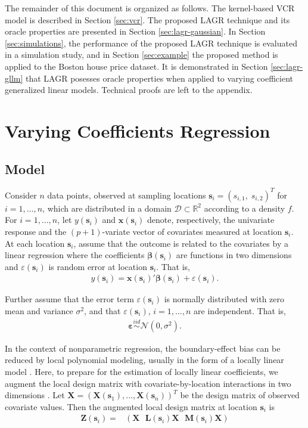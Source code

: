 \documentclass[authoryear,review, 12pt]{elsarticle}
\begin{document}
The remainder of this document is organized as follows. The kernel-based
VCR model is described in Section \ref{sec:vcr}. The proposed LAGR
technique and its oracle properties are presented in Section \ref{sec:lagr-gaussian}.
In Section \ref{sec:simulations}, the performance of the proposed
LAGR technique is evaluated in a simulation study, and in Section
\ref{sec:example} the proposed method is applied to the Boston house
price dataset. It is demonstrated in Section \ref{sec:lagr-gllm}
that LAGR posesses oracle properties when applied to varying coefficient
generalized linear models. Technical proofs are left to the appendix.


\section{Varying Coefficients Regression\label{sec:vcr}}


\subsection{Model}

Consider $n$ data points, observed at sampling locations $\bm{s}_{i}=(s_{i,1},\; s_{i,2})^{T}$
for $i=1,\dots,n$, which are distributed in a domain $\mathcal{D}\subset\mathbb{R}^{2}$
according to a density $f$. For $i=1,\dots,n$, let $y(\bm{s}_{i})$
and $\bm{x}(\bm{s}_{i})$ denote, respectively, the univariate response
and the $(p+1)$-variate vector of covariates measured at location
$\bm{s}_{i}$. At each location $\bm{s}_{i}$, assume that the outcome
is related to the covariates by a linear regression where the coefficients
$\bm{\beta}(\bm{s}_{i})$ are functions in two dimensions and $\varepsilon(\bm{s}_{i})$
is random error at location $\bm{s}_{i}$. That is, 
\begin{align}
y(\bm{s}_{i})=\bm{x}(\bm{s}_{i})'\bm{\beta}(\bm{s}_{i})+\varepsilon(\bm{s}_{i}).\label{eq:lm(s)}
\end{align}


Further assume that the error term $\varepsilon(\bm{s}_{i})$ is normally
distributed with zero mean and variance $\sigma^{2}$, and that $\varepsilon(\bm{s}_{i})$,
$i=1,\dots,n$ are independent. That is, 
\begin{align}
\bm{\varepsilon}\overset{iid}{\sim}\mathcal{N}\left(0,\sigma^{2}\right).\label{eq:err}
\end{align}


In the context of nonparametric regression, the boundary-effect bias
can be reduced by local polynomial modeling, usually in the form of
a locally linear model \citep{Fan-Gijbels-1996}. Here, to prepare
for the estimation of locally linear coefficients, we augment the
local design matrix with covariate-by-location interactions in two
dimensions \citep{Wang-2008b}. Let $\bm{X}=\left(\bm{X}\left(\bm{s}_{1}\right),\dots,\bm{X}\left(\bm{s}_{n}\right)\right)^{T}$
be the design matrix of observed covariate values. Then the augmented
local design matrix at location $\bm{s}_{i}$ is 
\begin{align}
\bm{Z}(\bm{s}_{i})= & \left(\bm{X}\ \:\:\bm{L}\left(\bm{s}_{i}\right)\bm{X}\ \:\:\bm{M}\left(\bm{s}_{i}\right)\bm{X}\right)\label{eq:augmented-covariates}
\end{align}
\end{document}
